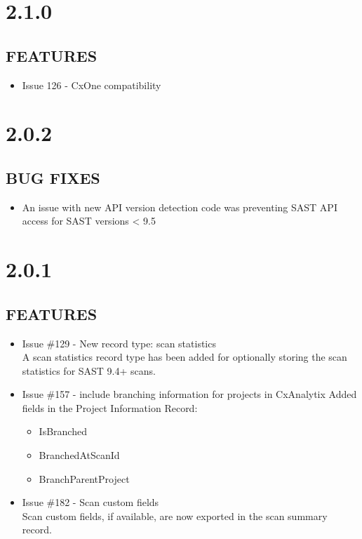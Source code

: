 \section{2.1.0}

\subsection*{FEATURES}
    \begin{itemize}
        \item Issue 126 - CxOne compatibility
    \end{itemize}


\section{2.0.2}
\subsection*{BUG FIXES}
    \begin{itemize}
        \item An issue with new API version detection code was preventing SAST API access for SAST versions < 9.5
    \end{itemize}


\section{2.0.1}

\subsection*{FEATURES}
    \begin{itemize}
        \item Issue \#129 - New record type: scan statistics\\
		\indent A scan statistics record type has been added for optionally storing the scan statistics for SAST 9.4+ scans.
	
        \item Issue \#157 - include branching information for projects in CxAnalytix
		\indent Added fields in the Project Information Record:
        \begin{itemize}
			\item IsBranched
			\item BranchedAtScanId
			\item BranchParentProject
        \end{itemize}
			
	    \item Issue \#182 - Scan custom fields\\
		\indent Scan custom fields, if available, are now exported in the scan summary record.    
    \end{itemize}

